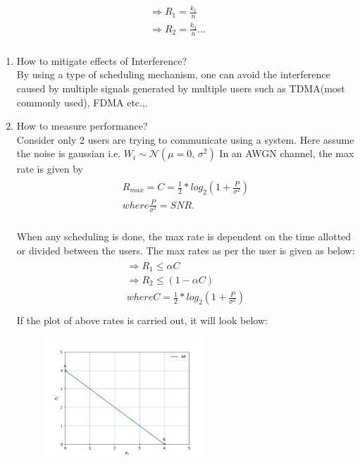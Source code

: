 \documentclass[a4paper]{article}
\begin{document}
\begin{enumerate}
\\
\begin{align}
\begin{split}
	\Rightarrow R_1 = \frac{k_1}{n}\\
	\Rightarrow R_2 = \frac{k_2}{n}...\\
\end{split}
\end{align}
\begin{enumerate}
\item How to mitigate effects of Interference?\\
By using a type of scheduling mechanism, one can avoid the interference caused by multiple signals generated by multiple users such as TDMA(most commonly used), FDMA etc.,.
\\
\item How to measure performance?\\
Consider only 2 users are trying to communicate using a system. Here assume the noise is gaussian i.e. $W_i \sim \mathcal{N}(\mu = 0,\,\sigma^{2})$
In an AWGN channel, the max rate  is  given by
\begin{align}
\begin{split}
R_{max} = C = \frac{1}{2}*log_2(1+\frac{P}{\sigma^2})\\
where \frac{P}{\sigma^2} = SNR.
\end{split}
\end{align}
\\
When any scheduling is done, the max rate is dependent on the time allotted or divided between the users. The max rates as per the user is given as below:
\begin{align}
\begin{split}
	\Rightarrow R_1 \leq \alpha C\\
	\Rightarrow R_2 \leq (1-\alpha C)\\
	where C = \frac{1}{2}*log_2(1+\frac{P}{\sigma^2})\\
\end{split}
\end{align}
If the plot of above rates is carried out, it will look below:
\begin{figure}[!ht]
\centering
\includegraphics[width=6.0cm]{R1_R2.png}

\end{figure}
\end{enumerate}
\end{enumerate}
\end{document}
